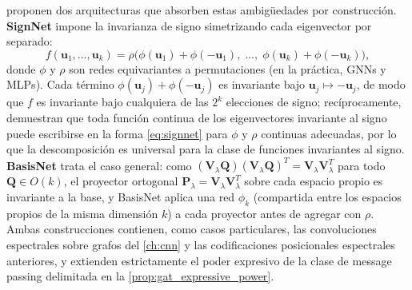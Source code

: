 \citet{lim2023signnet} proponen dos arquitecturas que absorben estas ambigüedades por construcción. \textbf{SignNet} impone la invarianza de signo simetrizando cada eigenvector por separado:
\begin{equation}
    f(\mathbf{u}_1, \ldots, \mathbf{u}_k) = \rho\big(\phi(\mathbf{u}_1) + \phi(-\mathbf{u}_1), \; \ldots, \; \phi(\mathbf{u}_k) + \phi(-\mathbf{u}_k)\big),
    \label{eq:signnet}
\end{equation}
donde $\phi$ y $\rho$ son redes equivariantes a permutaciones (en la práctica, \glspl{GNN} y \glspl{MLP}). Cada término $\phi(\mathbf{u}_j) + \phi(-\mathbf{u}_j)$ es invariante bajo $\mathbf{u}_j \mapsto -\mathbf{u}_j$, de modo que $f$ es invariante bajo cualquiera de las $2^k$ elecciones de signo; recíprocamente, \citet{lim2023signnet} demuestran que toda función continua de los eigenvectores invariante al signo puede escribirse en la forma \eqref{eq:signnet} para $\phi$ y $\rho$ continuas adecuadas, por lo que la descomposición es universal para la clase de funciones invariantes al signo. \textbf{BasisNet} trata el caso general: como $(\mathbf{V}_\lambda \mathbf{Q})(\mathbf{V}_\lambda \mathbf{Q})^T = \mathbf{V}_\lambda \mathbf{V}_\lambda^T$ para todo $\mathbf{Q} \in O(k)$, el proyector ortogonal $\mathbf{P}_\lambda = \mathbf{V}_\lambda \mathbf{V}_\lambda^T$ sobre cada espacio propio es invariante a la base, y BasisNet aplica una red $\phi_k$ (compartida entre los espacios propios de la misma dimensión $k$) a cada proyector antes de agregar con $\rho$. Ambas construcciones contienen, como casos particulares, las convoluciones espectrales sobre grafos del \autoref{ch:cnn} y las codificaciones posicionales espectrales anteriores, y extienden estrictamente el poder expresivo de la clase de message passing delimitada en la \autoref{prop:gat_expressive_power}.

